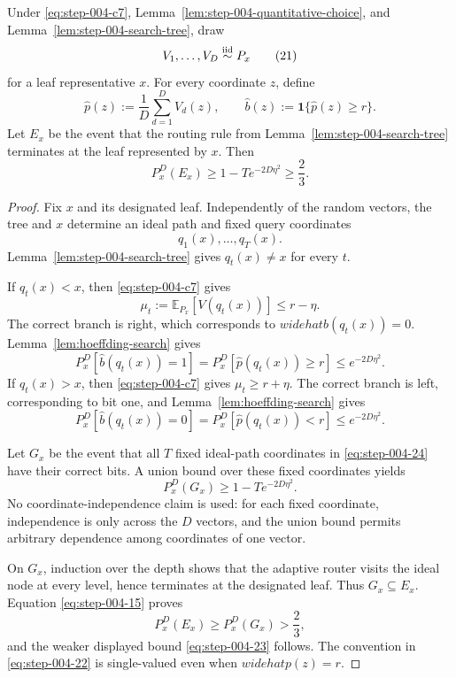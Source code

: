 \begin{proposition}
\label{prop:step-004-correct-path}

Under \eqref{eq:step-004-c7}, Lemma~\ref{lem:step-004-quantitative-choice}, and Lemma~\ref{lem:step-004-search-tree}, draw
\[
V_1,\ldots,V_D\stackrel{\rm iid}{\sim}P_x
\tag{21}\label{eq:step-004-21}
\]
for a leaf representative \(x\). For every coordinate \(z\), define
\[
\widehat p(z):=\frac1D\sum_{d=1}^D V_d(z),
\qquad
\widehat b(z):=\mathbf 1\{\widehat p(z)\ge r\}.
\tag{22}\label{eq:step-004-22}
\]
Let \(E_x\) be the event that the routing rule from Lemma~\ref{lem:step-004-search-tree} terminates at the leaf represented by \(x\). Then
\[
P_x^D(E_x)
\ge1-T e^{-2D\eta^2}
\ge\frac23.
\tag{23}\label{eq:step-004-23}
\]

\end{proposition}

\begin{proof}

Fix \(x\) and its designated leaf. Independently of the random vectors, the tree and \(x\) determine an ideal path and fixed query coordinates
\[
q_1(x),\ldots,q_T(x).
\tag{24}\label{eq:step-004-24}
\]
Lemma~\ref{lem:step-004-search-tree} gives \(q_t(x)\ne x\) for every \(t\).

If \(q_t(x)<x\), then \eqref{eq:step-004-c7} gives
\[
\mu_t:=\mathbb E_{P_x}[V(q_t(x))]\le r-\eta.
\]
The correct branch is right, which corresponds to \(widehat b(q_t(x))=0\). Lemma~\ref{lem:hoeffding-search} gives
\[
P_x^D\!\left[\widehat b(q_t(x))=1\right]
=P_x^D\!\left[\widehat p(q_t(x))\ge r\right]
\le e^{-2D\eta^2}.
\tag{25}\label{eq:step-004-25}
\]
If \(q_t(x)>x\), then \eqref{eq:step-004-c7} gives \(\mu_t\ge r+\eta\). The correct branch is left, corresponding to bit one, and Lemma~\ref{lem:hoeffding-search} gives
\[
P_x^D\!\left[\widehat b(q_t(x))=0\right]
=P_x^D\!\left[\widehat p(q_t(x))<r\right]
\le e^{-2D\eta^2}.
\tag{26}\label{eq:step-004-26}
\]

Let \(G_x\) be the event that all \(T\) fixed ideal-path coordinates in \eqref{eq:step-004-24} have their correct bits. A union bound over these fixed coordinates yields
\[
P_x^D(G_x)\ge1-T e^{-2D\eta^2}.
\tag{27}\label{eq:step-004-27}
\]
No coordinate-independence claim is used: for each fixed coordinate, independence is only across the \(D\) vectors, and the union bound permits arbitrary dependence among coordinates of one vector.

On \(G_x\), induction over the depth shows that the adaptive router visits the ideal node at every level, hence terminates at the designated leaf. Thus \(G_x \subseteq E_x\). Equation \eqref{eq:step-004-15} proves
\[
P_x^D(E_x)\ge P_x^D(G_x)>\frac23,
\]
and the weaker displayed bound \eqref{eq:step-004-23} follows. The convention in \eqref{eq:step-004-22} is single-valued even when \(widehat p(z)=r\).

\end{proof}


